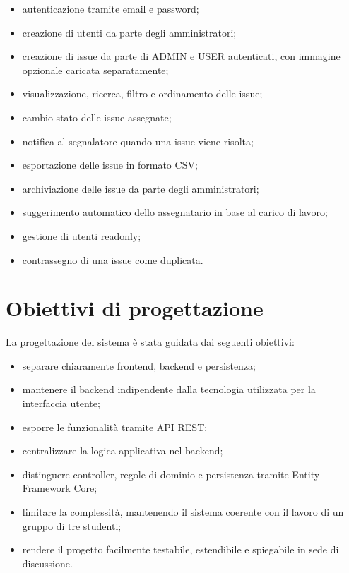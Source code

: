 \documentclass[12pt,a4paper]{article}
\begin{document}
\begin{itemize}
    \item autenticazione tramite email e password;
    \item creazione di utenti da parte degli amministratori;
    \item creazione di issue da parte di ADMIN e USER autenticati, con immagine opzionale caricata separatamente;
    \item visualizzazione, ricerca, filtro e ordinamento delle issue;
    \item cambio stato delle issue assegnate;
    \item notifica al segnalatore quando una issue viene risolta;
    \item esportazione delle issue in formato CSV;
    \item archiviazione delle issue da parte degli amministratori;
    \item suggerimento automatico dello assegnatario in base al carico di lavoro;
    \item gestione di utenti readonly;
    \item contrassegno di una issue come duplicata.
\end{itemize}

\section{Obiettivi di progettazione}

La progettazione del sistema è stata guidata dai seguenti obiettivi:

\begin{itemize}
    \item separare chiaramente frontend, backend e persistenza;
    \item mantenere il backend indipendente dalla tecnologia utilizzata per la interfaccia utente;
    \item esporre le funzionalità tramite API REST;
    \item centralizzare la logica applicativa nel backend;
    \item distinguere controller, regole di dominio e persistenza tramite Entity Framework Core;
    \item limitare la complessità, mantenendo il sistema coerente con il lavoro di un gruppo di tre studenti;
    \item rendere il progetto facilmente testabile, estendibile e spiegabile in sede di discussione.
\end{itemize}
\end{document}
